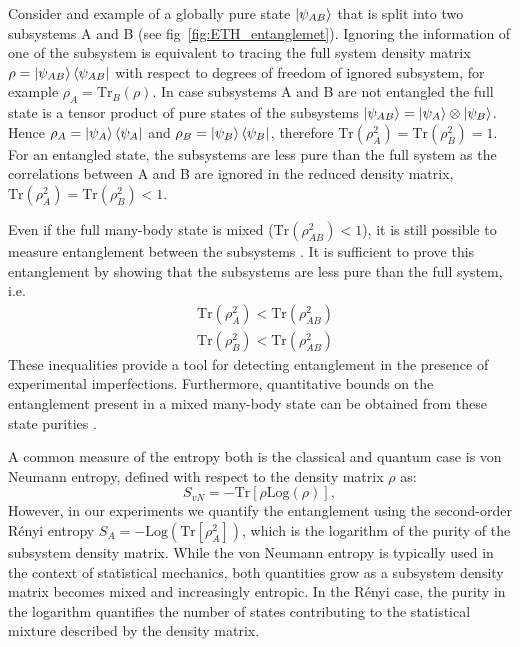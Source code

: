 Consider and example of a globally pure state $\left|\psi_{AB}\right\rangle$ that is split into two subsystems A and B (see fig~\ref{fig:ETH_entanglemet}). Ignoring the information of one of the subsystem is equivalent to tracing the full system density matrix $\rho = \left|\psi_{AB}\right\rangle\left\langle \psi_{AB}\right|$ with respect to degrees of freedom of ignored subsystem, for example $\rho_A =\textrm{Tr}_B(\rho)$. In case subsystems A and B are not entangled the full state is a tensor product of pure states of the subsystems $\left|\psi_{AB}\right\rangle=\left|\psi_{A}\right\rangle\otimes\left|\psi_{B}\right\rangle$. Hence $\rho_{A}= \left|\psi_{A}\right\rangle\left\langle \psi_{A}\right|$ and $\rho_B= \left|\psi_{B}\right\rangle\left\langle \psi_{B}\right|$, therefore $\textrm{Tr}(\rho_A^2)=\textrm{Tr}(\rho_B^2)=1$. For an entangled state, the subsystems are less pure than the full system as the correlations between A and B are ignored in the reduced density matrix, $\textrm{Tr}(\rho_A^2)=\textrm{Tr}(\rho_B^2)<1$.

Even if the full many-body state is mixed ($\textrm{Tr}(\rho_{AB}^2) < 1$), it is still possible to measure entanglement between the subsystems \cite{Rev. Mod. Phys., 81:865, 2009}. It is sufficient \cite{Physical Review A, vol. 54, no. 3,p. 1838, 1996} to prove this entanglement by showing that the subsystems are less pure than the full system, i.e.
\begin{equation}
\begin{aligned}
&\textrm{Tr}(\rho_{A}^2)<\textrm{Tr}(\rho_{AB}^2)    \\
&\textrm{Tr}(\rho_{B}^2)<\textrm{Tr}(\rho_{AB}^2)
\end{aligned}
\end{equation}
These inequalities provide a tool for detecting entanglement in the presence of experimental imperfections. Furthermore, quantitative bounds on the entanglement present in a mixed many-body state can be obtained from these state purities \cite{Phys. Rev. Lett., 98:140505, 2007}.

A common measure of the entropy both is the classical and quantum case is von Neumann entropy, defined with respect to the density matrix $\rho$ as:
\begin{equation}
S_{vN} = - \textrm{Tr}[\rho \textrm{Log}(\rho)],
\end{equation}
However, in our experiments we quantify the entanglement using the second-order R\'{e}nyi entropy $S_A = -\textrm{Log}(\textrm{Tr}[\rho_A^2])$, which is the logarithm of the purity of the subsystem density matrix. While the von Neumann entropy is typically used in the context of statistical mechanics, both quantities grow as a subsystem density matrix becomes mixed and increasingly entropic. In the R\'{e}nyi case, the purity in the logarithm quantifies the number of states contributing to the statistical mixture described by the density matrix. 

